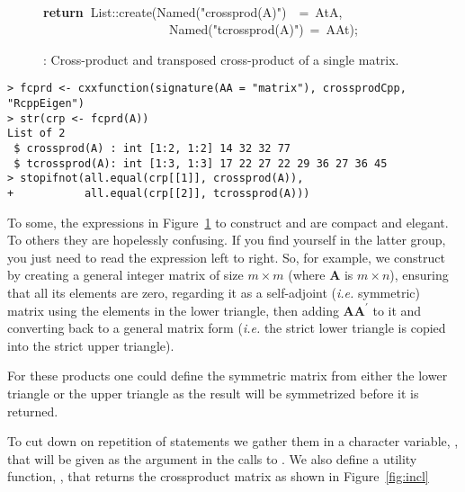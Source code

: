 \documentclass[shortnames,article]{jss}
\newcommand{\hlstd}[1]{\textcolor[rgb]{0,0,0}{#1}}
\newcommand{\hlopt}[1]{\textcolor[rgb]{0,0,0}{#1}}
\newcommand{\hlstr}[1]{\textcolor[rgb]{0.90,0.15,0.15}{#1}}
\newcommand{\hlkwa}[1]{\textcolor[rgb]{0.61,0.13,0.93}{\bf{#1}}}
\newcommand{\hlkwd}[1]{\textcolor[rgb]{0,0,0}{#1}}
\begin{document}
\begin{figure}[htb]
    \hlstd{}\hspace*{\fill}\\
    \hlkwa{return\ }\hlstd{List}\hlopt{::}\hlstd{}\hlkwd{create}\hlstd{}\hlopt{(}\hlstd{Named}\hlopt{{(}}\hlstd{}\hlstr{"crossprod(A)"}\hlstd{}\hlopt{{)}}\hlstd{\ \ }\hlopt{=\ }\hlstd{AtA}\hlopt{,}\hspace*{\fill}\\
    \hlstd{}\hlstd{\ \ \ \ \ \ \ \ \ \ \ \ \ \ \ \ \ \ \ \ }\hlstd{Named}\hlopt{{(}}\hlstd{}\hlstr{"tcrossprod(A)"}\hlstd{}\hlopt{{)}\ =\ }\hlstd{AAt}\hlopt{);}\hlstd{}\hspace*{\fill}
    \normalfont
    \normalsize
  \caption{: Cross-product and transposed cross-product of a single matrix.}
  \label{crossprod}
\end{figure}
\begin{verbatim}
> fcprd <- cxxfunction(signature(AA = "matrix"), crossprodCpp, "RcppEigen")
> str(crp <- fcprd(A))
List of 2
 $ crossprod(A) : int [1:2, 1:2] 14 32 32 77
 $ tcrossprod(A): int [1:3, 1:3] 17 22 27 22 29 36 27 36 45
> stopifnot(all.equal(crp[[1]], crossprod(A)),
+           all.equal(crp[[2]], tcrossprod(A)))
\end{verbatim}

To some, the expressions in Figure~\ref{crossprod} to construct
 and  are compact and elegant.  To others they are
hopelessly confusing.  If you find yourself in the latter group, you
just need to read the expression left to right.  So, for example, we
construct  by creating a general integer matrix of size
$m\times m$ (where $\bm A$ is $m\times n$), ensuring that all its
elements are zero, regarding it as a self-adjoint (\textit{i.e.} symmetric) matrix
using the elements in the lower triangle, then adding $\bm A\bm A^\prime$
to it and converting back to a general matrix form (\textit{i.e.} the strict lower
triangle is copied into the strict upper triangle).

For these products one could define the symmetric matrix from either
the lower triangle or the upper triangle as the result will be
symmetrized before it is returned.

To cut down on repetition of  statements we gather them in
a character variable, , that will be given as the  argument
in the calls to .  We also define a utility
function, , that returns the crossproduct matrix as shown in Figure~\ref{fig:incl}
\end{document}
